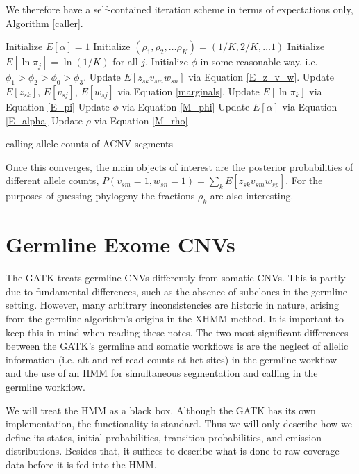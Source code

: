 \documentclass[nofootinbib,amssymb,amsmath]{revtex4}
\begin{document}
We therefore have a self-contained iteration scheme in terms of expectations only, Algorithm \ref{caller}.

 \begin{algorithm}
\begin{algorithmic}[1]
\State Initialize $E[\alpha] = 1$
\State Initialize $(\rho_1, \rho_2, \ldots \rho_K) = (1/K, 2/K, \ldots 1)$
\State Initialize $E[\ln \pi_j] = \ln (1/K)$ for all $j$.
\State Initialize $\phi$ in some reasonable way, i.e. $\phi_1 > \phi_2 > \phi_0 > \phi_3$.
\Repeat
  \State Update $E [z_{sk} v_{sm} w_{sn}]$ via Equation \ref{E_z_v_w}.
  \State Update $E \left[ z_{sk} \right]$, $E[v_{sj}]$, $E[w_{sj}]$ via Equation \ref{marginals}. 
  \State Update $E [ \ln \pi_k ] $ via Equation \ref{E_pi}
  \State Update $\phi$ via Equation \ref{M_phi}
  \State Update $E [ \alpha ] $ via Equation \ref{E_alpha}
  \State Update $\rho$ via Equation \ref{M_rho}
\end{algorithmic}
\caption{calling allele counts of ACNV segments}
\label{caller}
\end{algorithm}

  Once this converges, the main objects of interest are the posterior probabilities of different allele counts, $P(v_{sm} = 1, w_{sn} = 1) = \sum_k E \left[ z_{sk} v_{sm} w_{sp} \right]$.  For the purposes of guessing phylogeny the fractions $\rho_k$ are also interesting.

\section{Germline Exome CNVs} \label{germline}
The GATK treats germline CNVs differently from somatic CNVs.  This is partly due to fundamental differences, such as the absence of subclones in the germline setting.  However, many arbitrary inconsistencies are historic in nature, arising from the germline algorithm's origins in the XHMM method.  It is important to keep this in mind when reading these notes.  The two most significant differences between the GATK's germline and somatic workflows is are the neglect of allelic information (i.e. alt and ref read counts at het sites) in the germline workflow and the use of an HMM for simultaneous segmentation and calling in the germline workflow.  

We will treat the HMM as a black box.  Although the GATK has its own implementation, the functionality is standard.  Thus we will only describe how we define its states, initial probabilities, transition probabilities, and emission distributions.  Besides that, it suffices to describe what is done to raw coverage data before it is fed into the HMM.
\end{document}
